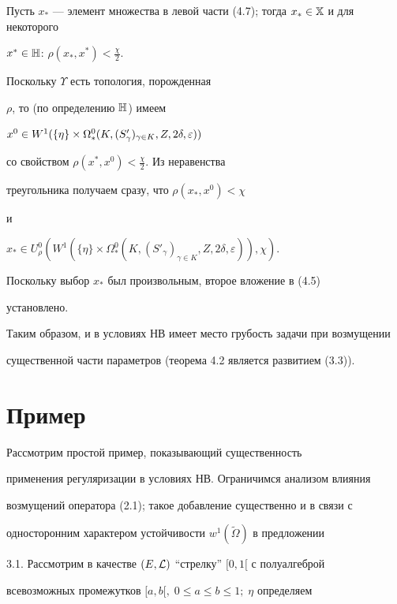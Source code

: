 \begin{pf}
Пусть $x_*$ --- элемент множества в левой части (4.7); тогда $x_*


\in {\Bbb X}$ и для некоторого


$x^* \in {\Bbb H}$: $\rho(x_*, x^*) <\frac{\chi}{2}$.


Поскольку $\Upsilon$ есть топология, порожденная


$\rho$, то (по определению ${\Bbb H}$) имеем 


$x^0 \in W^1(\{\eta\}


\times \Omega_*^0(K, (S'_\gamma)_{\gamma \in K}, Z, 2\delta, \var))$


со свойством $\rho(x^*, x^0) < \frac{\chi}{2}$. Из неравенства


треугольника получаем сразу, что $\rho(x_*, x^0) < \chi$ 


и


${x_*} \in {U^0_\rho}({W^1}(\{\eta\} \times {{\Omega}^0_*}(K,


{(S'_\gamma)_{\gamma \in K}},Z,{2\delta},\varepsilon)),\chi)$.


Поскольку выбор $x_*$ был произвольным, второе вложение в (4.5)


установлено.


\end{pf}





Таким образом, и в условиях НВ имеет место грубость задачи при возмущении


существенной части параметров (теорема 4.2 является развитием (3.3)).





\section{Пример}





Рассмотрим простой пример, показывающий существенность


применения регуляризации в условиях НВ. Ограничимся анализом влияния


возмущений оператора (2.1); такое добавление существенно и в связи с


односторонним характером устойчивости ${w^1}({\tilde \Omega})$ в предложении


3.1. Рассмотрим в качестве $(E,{\cal L})$ ``стрелку'' $[0,1[$ с полуалгеброй


всевозможных промежутков $[a,b[,\;0 \le a \le b \le 1;\;\eta$ определяем


